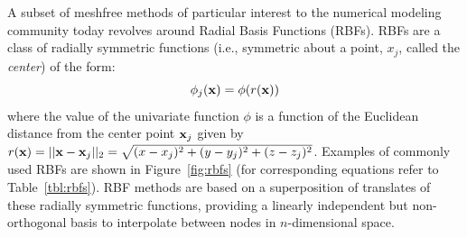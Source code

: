 \documentclass[11pt]{report}
\begin{document}
%

A subset of meshfree methods of particular interest to the
numerical modeling community today revolves around Radial Basis Functions (RBFs).
RBFs are a class of radially symmetric functions (i.e.,
symmetric about a point, $x_j$, called the \emph{center}) of the
form: 
	\begin{equation*} 
		\phi_j(\mathbf{x}) = \phi(r(\mathbf{x}))
	\end{equation*} 
where the value of the univariate function $\phi$ is a
function of the Euclidean distance from the center point $\mathbf{x}_j$ given by
$r(\mathbf{x}) = ||\mathbf{x}-\mathbf{x}_j||_2 = \sqrt{(x-x_j)^2 + (y-y_j)^2 + (z-z_j)^2}$. Examples of
commonly used RBFs are shown in Figure~\ref{fig:rbfs} (for corresponding equations refer to Table~\ref{tbl:rbfs}). RBF
methods are based on a superposition of translates of these
radially symmetric functions, providing a linearly independent
but non-orthogonal basis to interpolate between nodes in
$n$-dimensional space. 
\end{document}
